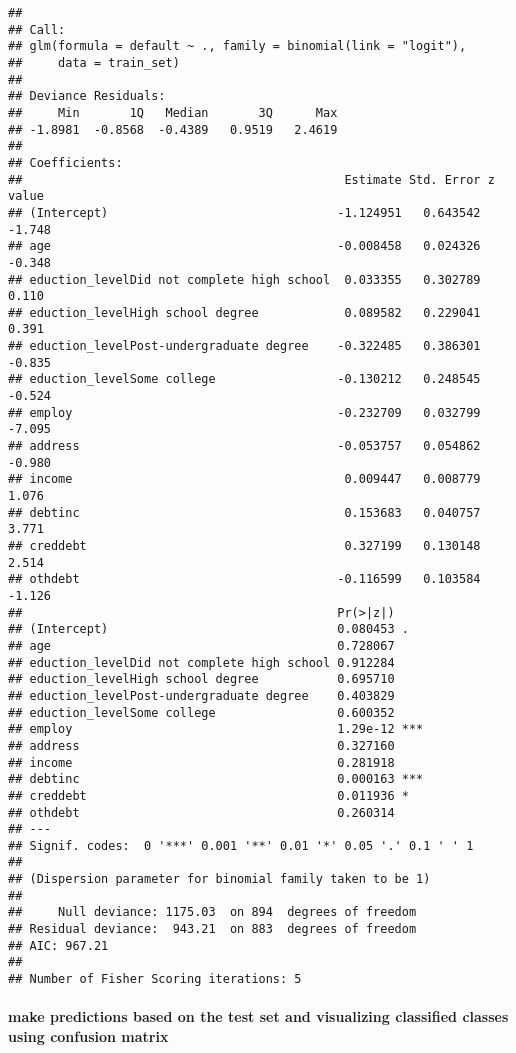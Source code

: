 \documentclass[]{article}
\let\oldparagraph\paragraph
\renewcommand{\paragraph}[1]{\oldparagraph{#1}\mbox{}}
\begin{document}
\begin{verbatim}
## 
## Call:
## glm(formula = default ~ ., family = binomial(link = "logit"), 
##     data = train_set)
## 
## Deviance Residuals: 
##     Min       1Q   Median       3Q      Max  
## -1.8981  -0.8568  -0.4389   0.9519   2.4619  
## 
## Coefficients:
##                                             Estimate Std. Error z value
## (Intercept)                                -1.124951   0.643542  -1.748
## age                                        -0.008458   0.024326  -0.348
## eduction_levelDid not complete high school  0.033355   0.302789   0.110
## eduction_levelHigh school degree            0.089582   0.229041   0.391
## eduction_levelPost-undergraduate degree    -0.322485   0.386301  -0.835
## eduction_levelSome college                 -0.130212   0.248545  -0.524
## employ                                     -0.232709   0.032799  -7.095
## address                                    -0.053757   0.054862  -0.980
## income                                      0.009447   0.008779   1.076
## debtinc                                     0.153683   0.040757   3.771
## creddebt                                    0.327199   0.130148   2.514
## othdebt                                    -0.116599   0.103584  -1.126
##                                            Pr(>|z|)    
## (Intercept)                                0.080453 .  
## age                                        0.728067    
## eduction_levelDid not complete high school 0.912284    
## eduction_levelHigh school degree           0.695710    
## eduction_levelPost-undergraduate degree    0.403829    
## eduction_levelSome college                 0.600352    
## employ                                     1.29e-12 ***
## address                                    0.327160    
## income                                     0.281918    
## debtinc                                    0.000163 ***
## creddebt                                   0.011936 *  
## othdebt                                    0.260314    
## ---
## Signif. codes:  0 '***' 0.001 '**' 0.01 '*' 0.05 '.' 0.1 ' ' 1
## 
## (Dispersion parameter for binomial family taken to be 1)
## 
##     Null deviance: 1175.03  on 894  degrees of freedom
## Residual deviance:  943.21  on 883  degrees of freedom
## AIC: 967.21
## 
## Number of Fisher Scoring iterations: 5
\end{verbatim}

\hypertarget{make-predictions-based-on-the-test-set-and-visualizing-classified-classes-using-confusion-matrix}{%
\paragraph{make predictions based on the test set and visualizing
classified classes using confusion
matrix}\label{make-predictions-based-on-the-test-set-and-visualizing-classified-classes-using-confusion-matrix}}
\end{document}
